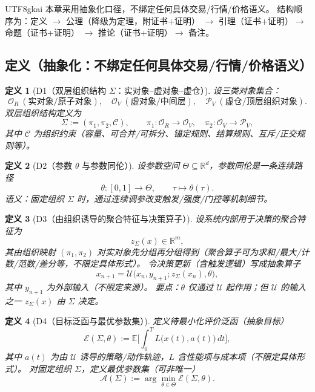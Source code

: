 \documentclass[12pt]{article}
\newtheorem{definition}{定义}[section]
\newcommand{\RR}{\mathbb{R}}
\begin{document}
\begin{CJK*}{UTF8}{gkai}
本章采用抽象化口径，不绑定任何具体交易/行情/价格语义。
结构顺序为：定义 $\rightarrow$ 公理（降级为定理，附证书+证明）
$\rightarrow$ 引理（证书+证明）$\rightarrow$ 命题（证书+证明）
$\rightarrow$ 推论（证书+证明）$\rightarrow$ 备注。

\subsection{定义（抽象化：不绑定任何具体交易/行情/价格语义）}
\label{subsec:tex28-ch8-defs}

\begin{definition}[D1（双层组织结构 $\Sigma$：实对象--虚对象--虚仓）]
\label{def:tex28-ch8-d1}
设三类对象集合：
\[
  \mathcal{O}_R\ (\text{实对象/原子对象}),\quad
  \mathcal{O}_V\ (\text{虚对象/中间层}),\quad
  \mathcal{P}_V\ (\text{虚仓/顶层组织对象}).
\]
双层组织结构定义为
\[
  \Sigma := (\pi_1,\pi_2,\mathcal{C}),
  \qquad
  \pi_1:\mathcal{O}_R\to\mathcal{O}_V,\quad
  \pi_2:\mathcal{O}_V\to\mathcal{P}_V,
\]
其中 $\mathcal{C}$ 为组织约束（容量、可合并/可拆分、锚定规则、结算规则、互斥/正交规则等）。
\end{definition}

\begin{definition}[D2（参数 $\theta$ 与参数同伦）]
\label{def:tex28-ch8-d2}
设参数空间 $\Theta\subseteq\RR^d$，参数同伦是一条连续路径
\[
  \theta:[0,1]\to\Theta,\qquad \tau\mapsto\theta(\tau).
\]
语义：固定组织 $\Sigma$ 时，通过连续调参改变触发/强度/门控等机制细节。
\end{definition}

\begin{definition}[D3（由组织诱导的聚合特征与决策算子）]
\label{def:tex28-ch8-d3}
设系统内部用于决策的聚合特征为
\[
  z_{\Sigma}(x)\in\RR^m,
\]
其由组织映射 $(\pi_1,\pi_2)$ 对实对象先分组再分组得到（聚合算子可为求和/最大/计数/范数/差分等，不限定具体形式）。
令决策更新（含触发逻辑）写成抽象算子
\[
  x_{n+1}=\mathcal{U}\bigl(x_n,y_{n+1};z_{\Sigma}(x_n),\theta\bigr),
\]
其中 $y_{n+1}$ 为外部输入（不限定来源）。
要点：$\theta$ 仅通过 $\mathcal{U}$ 起作用；但 $\mathcal{U}$ 的输入之一 $z_{\Sigma}(x)$ 由 $\Sigma$ 决定。
\end{definition}

\begin{definition}[D4（目标泛函与最优参数集）]
\label{def:tex28-ch8-d4}
定义待最小化评价泛函（抽象目标）
\[
  \mathcal{E}(\Sigma,\theta):=\mathbb{E}\!\Big[\int_0^T L\bigl(x(t),a(t)\bigr)\,dt\Big],
\]
其中 $a(t)$ 为由 $\mathcal{U}$ 诱导的策略/动作轨迹，$L$ 含性能项与成本项（不限定具体形式）。
对固定组织 $\Sigma$，定义最优参数集（可非唯一）
\[
  \mathcal{A}(\Sigma):=\arg\min_{\theta\in\Theta}\mathcal{E}(\Sigma,\theta).
\]
\end{definition}


\end{CJK*}
\end{document}
